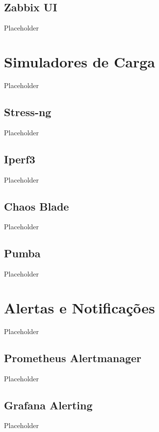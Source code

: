 \subsection{Zabbix UI}
Placeholder

\section{Simuladores de Carga}
Placeholder

\subsection{Stress-ng}
Placeholder

\subsection{Iperf3}
Placeholder

\subsection{Chaos Blade}
Placeholder

\subsection{Pumba}
Placeholder

\section{Alertas e Notificações}
Placeholder

\subsection{Prometheus Alertmanager}
Placeholder

\subsection{Grafana Alerting}
Placeholder